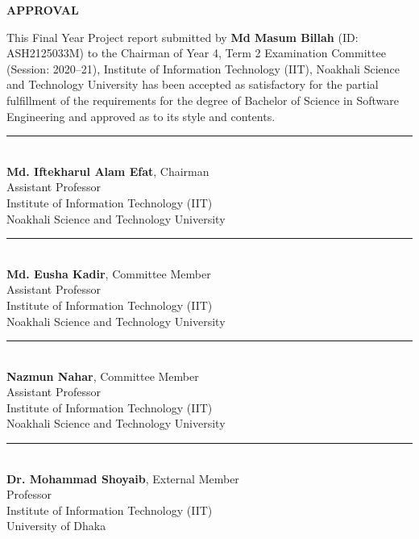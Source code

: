 
\begin{center}
	{\Large\bfseries APPROVAL}
\end{center}

This Final Year Project report submitted by \textbf{Md Masum Billah} (ID: ASH2125033M) to the Chairman of Year 4, Term 2 Examination Committee (Session: 2020--21), Institute of Information Technology (IIT), Noakhali Science and Technology University has been accepted as satisfactory for the partial fulfillment of the requirements for the degree of Bachelor of Science in Software Engineering and approved as to its style and contents.

\vspace{1cm}

\vspace{2cm}

\noindent
\rule{8cm}{0.4pt}\\
\textbf{Md. Iftekharul Alam Efat}, Chairman\\
Assistant Professor\\
Institute of Information Technology (IIT)\\
Noakhali Science and Technology University

\vspace{1.5cm}

\noindent
\rule{8cm}{0.4pt}\\
\textbf{Md. Eusha Kadir}, Committee Member\\
Assistant Professor\\
Institute of Information Technology (IIT)\\
Noakhali Science and Technology University

\vspace{1.5cm}

\noindent
\rule{8cm}{0.4pt}\\
\textbf{Nazmun Nahar}, Committee Member\\
Assistant Professor\\
Institute of Information Technology (IIT)\\
Noakhali Science and Technology University



\vspace{1.5cm}

\noindent
\rule{8cm}{0.4pt}\\
\textbf{Dr. Mohammad Shoyaib}, External Member\\
Professor\\
Institute of Information Technology (IIT)\\
University of Dhaka

\clearpage